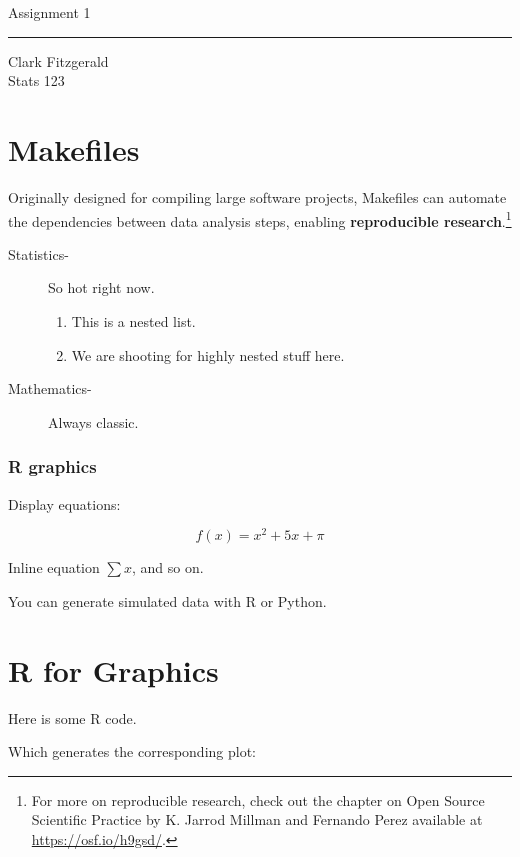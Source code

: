 \documentclass[12pt]{article}
\begin{document}
\begin{center}
    {\Large Assignment 1}\\
    \bigskip
    \hrule
    \medskip
    Clark Fitzgerald\\
    Stats 123
\end{center}

\section*{Makefiles}

Originally designed for compiling large software projects, Makefiles can automate the dependencies between data analysis steps, enabling \textbf{reproducible research}.\footnote{For more on reproducible research, check out the chapter on Open Source Scientific Practice by K. Jarrod Millman and Fernando Perez available at \url{https://osf.io/h9gsd/}.}

\begin{description}
    \item[Statistics-] So hot right now.
    \begin{enumerate}
        \item This is a nested list.
        \item We are shooting for highly nested stuff here.
    \end{enumerate}
    \item[Mathematics-] Always classic.
\end{description}

\vspace{0.3in}

\subsubsection*{R graphics}

Display equations:

\[
    f(x) = x^2 + 5x + \pi
\]

Inline equation $\sum x$, and so on.

You can generate simulated data with R or Python.

\section{R for Graphics}

Here is some R code.



Which generates the corresponding plot:
\end{document}
